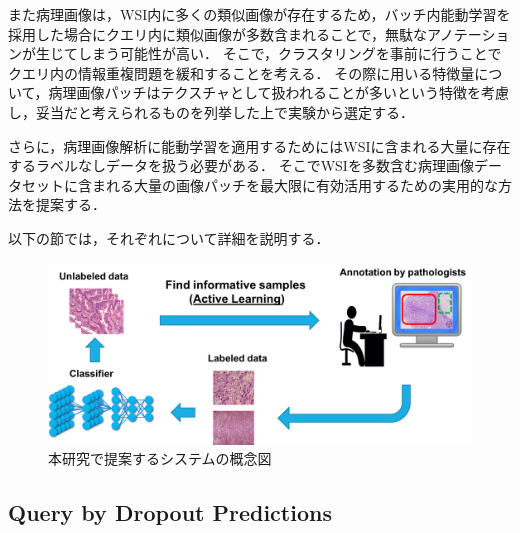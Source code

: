 また病理画像は，WSI内に多くの類似画像が存在するため，バッチ内能動学習を採用した場合にクエリ内に類似画像が多数含まれることで，無駄なアノテーションが生じてしまう可能性が高い．
そこで，クラスタリングを事前に行うことでクエリ内の情報重複問題を緩和することを考える．
その際に用いる特徴量について，病理画像パッチはテクスチャとして扱われることが多いという特徴を考慮し，妥当だと考えられるものを列挙した上で実験から選定する．

さらに，病理画像解析に能動学習を適用するためにはWSIに含まれる大量に存在するラベルなしデータを扱う必要がある．
そこでWSIを多数含む病理画像データセットに含まれる大量の画像パッチを最大限に有効活用するための実用的な方法を提案する．

以下の節では，それぞれについて詳細を説明する．

\begin{figure}[tbp]
    \label{fig:overview}
     \begin{center}
      \includegraphics[width=120mm]{figures/overview.png}
     \end{center}
    \caption{本研究で提案するシステムの概念図}
\end{figure}

\subsection{\textbf{Query by Dropout Predictions}}
